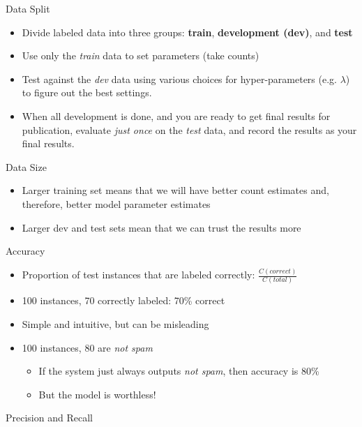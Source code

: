 \documentclass[11pt,letterpaper]{article}
\begin{document}
Data Split

\begin{itemize}
  \item Divide labeled data into three groups: \textbf{train}, \textbf{development (dev)}, and \textbf{test}
  \item Use only the \textit{train} data to set parameters (take counts)
  \item Test against the \textit{dev} data using various choices for hyper-parameters (e.g. $\lambda$) to figure out the best settings.
  \item When all development is done, and you are ready to get final results for publication, evaluate \textit{just once} on the \textit{test} data, and record the results as your final results.
\end{itemize}


Data Size

\begin{itemize}
  \item Larger training set means that we will have better count estimates and, therefore, better model parameter estimates
  \item Larger dev and test sets mean that we can trust the results more
\end{itemize}


Accuracy

\begin{itemize}
  \item Proportion of test instances that are labeled correctly: $\frac{C(correct)}{C(total)}$
  \item 100 instances, 70 correctly labeled: 70\% correct
  \item Simple and intuitive, but can be misleading
  \item 100 instances, 80 are \textit{not spam}
    \begin{itemize}
      \item If the system just always outputs \textit{not spam}, then accuracy is 80\%
      \item But the model is worthless!
    \end{itemize}
\end{itemize}


Precision and Recall
\end{document}
